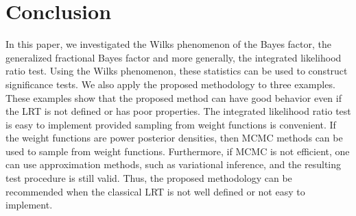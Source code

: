 \documentclass[11pt]{article}
\theoremstyle{plain}
\theoremstyle{definition}
\theoremstyle{remark}
\begin{document}
\section{Conclusion} \label{sec:conclusion}
In this paper, we investigated the Wilks phenomenon of the Bayes factor, the generalized fractional Bayes factor and more generally, the integrated likelihood ratio test.
Using the Wilks phenomenon, these statistics can be used to construct significance tests.
We also apply the proposed methodology to three examples.
These examples show that the proposed method can have good behavior even if the LRT is not defined or has poor properties.
The integrated likelihood ratio test is easy to implement provided sampling from weight functions is convenient.
If the weight functions are power posterior densities, then MCMC methods can be used to sample from weight functions.
Furthermore, if MCMC is not efficient, one can use approximation methods, such as variational inference, and the resulting test procedure is still valid.
Thus, the proposed methodology can be recommended when the classical LRT is not well defined or not easy to implement.







\end{document}

